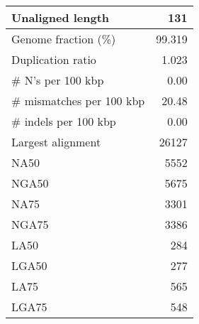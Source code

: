 \documentclass[12pt,a4paper]{article}
\begin{document}
\begin{table}[ht]
\begin{center}
\begin{tabular}{|l*{1}{|r}|}
Unaligned length & 131 \\ \hline
Genome fraction (\%) & 99.319 \\ \hline
Duplication ratio & 1.023 \\ \hline
\# N's per 100 kbp & 0.00 \\ \hline
\# mismatches per 100 kbp & 20.48 \\ \hline
\# indels per 100 kbp & 0.00 \\ \hline
Largest alignment & 26127 \\ \hline
NA50 & 5552 \\ \hline
NGA50 & 5675 \\ \hline
NA75 & 3301 \\ \hline
NGA75 & 3386 \\ \hline
LA50 & 284 \\ \hline
LGA50 & 277 \\ \hline
LA75 & 565 \\ \hline
LGA75 & 548 \\ \hline
\end{tabular}
\end{center}
\end{table}
\end{document}
